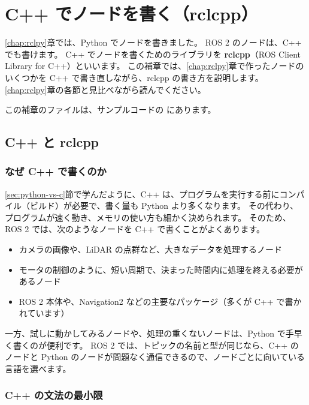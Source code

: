 \chapter{C++ でノードを書く（rclcpp）}
\label{sup:rclcpp}

\ref{chap:rclpy}章では、Python でノードを書きました。
ROS 2 のノードは、C++ でも書けます。
C++ でノードを書くためのライブラリを \textbf{rclcpp}（ROS Client Library for C++）といいます。
この補章では、\ref{chap:rclpy}章で作ったノードのいくつかを C++ で書き直しながら、rclcpp の書き方を説明します。
\ref{chap:rclpy}章の各節と見比べながら読んでください。

この補章のファイルは、サンプルコードの \allowbreak{} にあります。

\section{C++ と rclcpp}
\label{sec:rclcpp-intro}

\subsection{なぜ C++ で書くのか}

\ref{sec:python-vs-c}節で学んだように、C++ は、プログラムを実行する前にコンパイル（ビルド）が必要で、書く量も Python より多くなります。
その代わり、プログラムが速く動き、メモリの使い方も細かく決められます。
そのため、ROS 2 では、次のようなノードを C++ で書くことがよくあります。

\begin{itemize}
  \item カメラの画像や、LiDAR の点群など、大きなデータを処理するノード
  \item モータの制御のように、短い周期で、決まった時間内に処理を終える必要があるノード
  \item ROS 2 本体や、Navigation2 などの主要なパッケージ（多くが C++ で書かれています）
\end{itemize}

一方、試しに動かしてみるノードや、処理の重くないノードは、Python で手早く書くのが便利です。
ROS 2 では、トピックの名前と型が同じなら、C++ のノードと Python のノードが問題なく通信できるので、ノードごとに向いている言語を選べます。

\subsection{C++ の文法の最小限}


